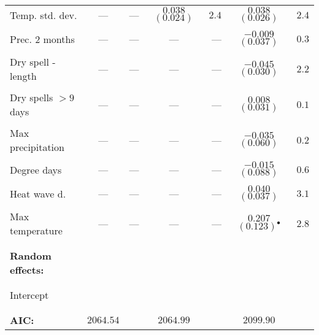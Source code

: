 \documentclass[a4paper,12pt]{article}
\begin{document}
{\begin{threeparttable}
\begin{footnotesize}
\begin{tabular}{lcrcrcr}
        \vspace{-0.2cm}Temp. std. dev.&---&---&$0.038$ $(0.024)^{}$&$2.4$&$0.038$ $(0.026)^{}$&$2.4$\\
  \\
          \vspace{-0.2cm}Prec. 2 months&---&---&---&---&$-0.009$ $(0.037)^{}$&$0.3$\\
  \\
         \vspace{-0.2cm}Dry spell -length&---&---&---&---&$-0.045$ $(0.030)^{}$&$2.2$\\
  \\
        \vspace{-0.2cm}Dry spells $>9$ days&---&---&---&---&$0.008$ $(0.031)^{}$&$0.1$\\
  \\
          \vspace{-0.2cm}Max precipitation&---&---&---&---&$-0.035$ $(0.060)^{}$&$0.2$\\
  \\
          \vspace{-0.2cm}Degree days&---&---&---&---&$-0.015$ $(0.088)^{}$&$0.6$\\
  \\
          \vspace{-0.2cm}Heat wave d.&---&---&---&---&$0.040$ $(0.037)^{}$&$3.1$\\
  \\
          \vspace{-0.2cm}Max temperature&---&---&---&---&$0.207$ $(0.123)^{\bullet}$&$2.8$\\
  \\
  \hline
\vspace{-0.2cm} \\
  \multicolumn{1}{l}{\textbf{Random effects:}}  & \\
\vspace{-0.2cm}
\\
\hline
\\
  \vspace{-0.2cm}Intercept\\
  \vspace{-0.1cm} \\ 
  \hline
  \vspace{-0.2cm} \\
  \multicolumn{1}{l}{\textbf{AIC:}}&$2064.54$&&$2064.99$&&$2099.90$\\


\end{tabular}
\end{footnotesize}
\end{threeparttable}}
\end{document}
